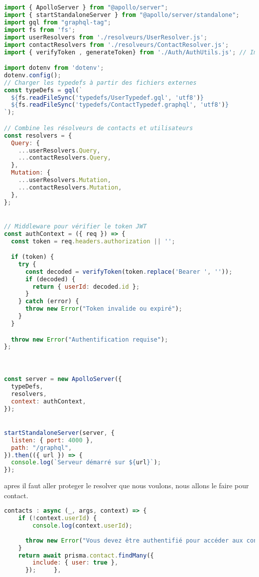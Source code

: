 \documentclass{article}
\begin{document}
\begin{lstlisting}[language=JavaScript]


import { ApolloServer } from "@apollo/server";
import { startStandaloneServer } from "@apollo/server/standalone";
import gql from "graphql-tag";
import fs from 'fs';
import userResolvers from './resolveurs/UserResolver.js';
import contactResolvers from './resolveurs/ContactResolver.js';
import { verifyToken , generateToken} from './Auth/AuthUtils.js'; // Import de la fonction de vérification du token

import dotenv from 'dotenv';
dotenv.config();
// Charger les typedefs à partir des fichiers externes
const typeDefs = gql(`
  ${fs.readFileSync('typedefs/UserTypedef.gql', 'utf8')}
  ${fs.readFileSync('typedefs/ContactTypedef.graphql', 'utf8')}
`);

// Combine les résolveurs de contacts et utilisateurs
const resolvers = {
  Query: {
    ...userResolvers.Query,
    ...contactResolvers.Query,
  },
  Mutation: {
    ...userResolvers.Mutation,
    ...contactResolvers.Mutation,
  },
};


// Middleware pour vérifier le token JWT
const authContext = ({ req }) => {
  const token = req.headers.authorization || '';

  if (token) {
    try {
      const decoded = verifyToken(token.replace('Bearer ', '')); 
      if (decoded) {
        return { userId: decoded.id }; 
      }
    } catch (error) {
      throw new Error("Token invalide ou expiré");
    }
  }

  throw new Error("Authentification requise");
};



const server = new ApolloServer({
  typeDefs,
  resolvers,
  context: authContext,
});


startStandaloneServer(server, {
  listen: { port: 4000 },
  path: "/graphql",
}).then(({ url }) => {
  console.log(`Serveur démarré sur ${url}`);
});

 \end{lstlisting}


apres il faut aller proteger le resolver que nous  voulons, nous allons le faire pour contact.



\begin{lstlisting}[language=JavaScript]
contacts : async (_, args, context) => {
    if (!context.userId) {
        console.log(context.userId);
        
      throw new Error("Vous devez être authentifié pour accéder aux contacts");
    }
    return await prisma.contact.findMany({
        include: { user: true },
      });     },

\end{lstlisting}
  \vspace{1cm}
\end{document}

